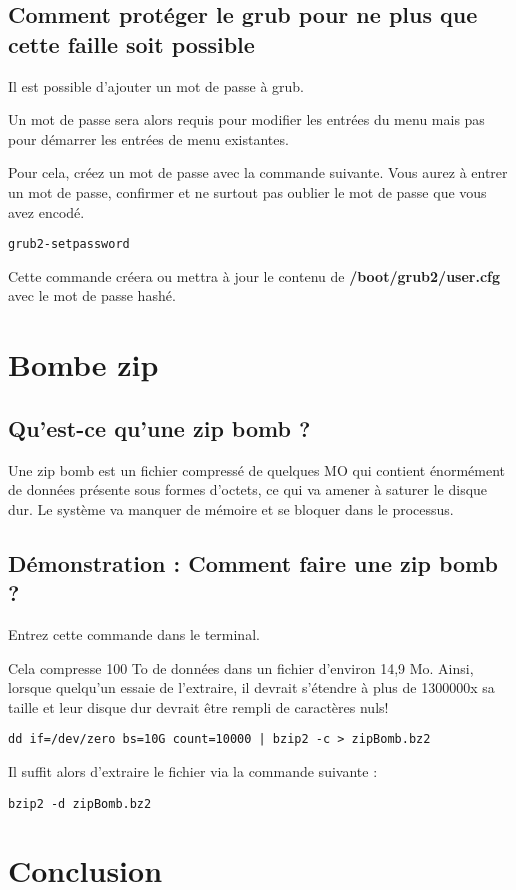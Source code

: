 \documentclass[a4paper, 12pt]{article}
\begin{document}
   \subsection{Comment protéger le grub pour ne plus que cette faille soit possible} 
   \begin{flushleft}
       \noindent Il est possible d'ajouter un mot de passe à grub.
       \item Un mot de passe sera alors requis pour modifier les entrées du menu mais pas pour démarrer les entrées de menu existantes. 
       \item Pour cela, créez un mot de passe avec la commande suivante. Vous aurez à entrer un mot de passe, confirmer et ne surtout pas oublier le mot de passe que vous avez encodé.
       \begin{lstlisting}
grub2-setpassword
       \end{lstlisting}
       \item Cette commande créera ou mettra à jour le contenu de \textbf{/boot/grub2/user.cfg} avec le mot de passe hashé. \cite{Howtopro9:online}
       
   \end{flushleft}
   \section{Bombe zip}
   		\subsection{Qu'est-ce qu'une zip bomb ?}
         Une zip bomb est un fichier compressé de quelques MO qui contient énormément de données présente sous formes d'octets, ce qui va amener à saturer le disque dur. Le système va manquer de mémoire et se bloquer dans le processus.
		\subsection{Démonstration : Comment faire une zip bomb ?}
		\begin{flushleft}
			\noindent Entrez cette commande dans le terminal. 
			\item Cela compresse 100 To de données dans un fichier d’environ 14,9 Mo. Ainsi, lorsque quelqu’un essaie de l’extraire, il devrait s’étendre à plus de 1300000x sa taille et leur disque dur devrait être rempli de caractères nuls!
		
			\begin{lstlisting}
dd if=/dev/zero bs=10G count=10000 | bzip2 -c > zipBomb.bz2
        	\end{lstlisting}
        	\item Il suffit alors d'extraire le fichier via la commande suivante : 
        	\begin{lstlisting}
bzip2 -d zipBomb.bz2
        	\end{lstlisting}
        \end{flushleft}

    \section{Conclusion}
        \nocite{*}
	
	
\end{document}
